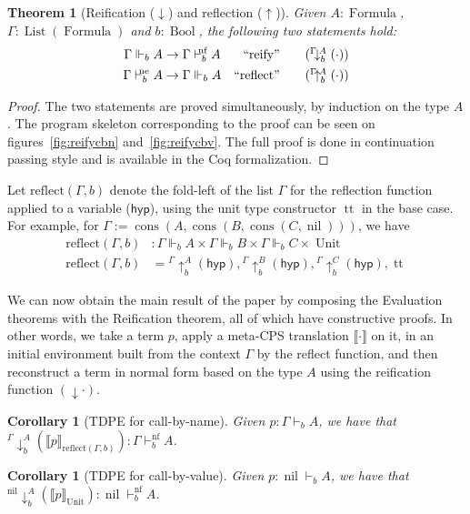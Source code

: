 \documentclass{eptcs}
\newcommand{\hyp}{\mathsf{hyp}}
\DeclareMathOperator{\Nil}{nil}
\DeclareMathOperator{\Cons}{cons}
\DeclareMathOperator{\Unit}{Unit}
\DeclareMathOperator{\one}{tt}
\DeclareMathOperator{\Bool}{Bool}
\DeclareMathOperator{\Formula}{Formula}
\DeclareMathOperator{\List}{List}
\newcommand{\normal}{{\!\!\text{nf}}}
\newcommand{\neutral}{{\!\!\text{ne}}}
\newcommand{\forces}[3]{{#1}\Vdash_{#2}{#3}}
\newcommand{\nil}{{\Nil}}
\newcommand{\cons}[2]{{\Cons{(#1,#2)}}}
\newcommand{\lsup}[1]{{{^#1}}\!\!\!}
\newcommand{\reify}[4]{\lsup{#1}\downarrow_{#2}^{\!{#3}}({#4})}
\newcommand{\reflect}[4]{\lsup{#1}\uparrow_{#2}^{\!{#3}}({#4})}
\newcommand{\eval}[2]{\llbracket{#1}\rrbracket_{#2}}
\newcommand{\Gammareflect}[2]{\text{reflect}({#1},{#2})}
\theoremstyle{definition}
\theoremstyle{plain}
\newtheorem{theorem}[definition]{Theorem}
\newtheorem{corollary}[definition]{Corollary}
\theoremstyle{remark}
\begin{document}
\begin{theorem}[Reification ($\downarrow$) and reflection ($\uparrow$)] Given $A:\Formula$, $\Gamma:\List(\Formula)$ and $b:\Bool$, the following two statements hold:
  \begin{align}
    \forces{\Gamma}{b}{A} &\to \Gamma\vdash^\normal_b A & \text{``reify''} \tag{$\reify{\Gamma}{b}{A}{\cdot}$}\\
    \Gamma\vdash^\neutral_b A &\to \forces{\Gamma}{b}{A} & \text{``reflect''} \tag{$\reflect{\Gamma}{b}{A}{\cdot}$}
  \end{align}
\end{theorem}
\begin{proof} The two statements are proved simultaneously, by induction on the type $A$. The program skeleton corresponding to the proof can be seen on figures~\ref{fig:reifycbn} and~\ref{fig:reifycbv}. The full proof is done in continuation passing style and is available in the Coq formalization.
\end{proof}

Let $\Gammareflect{\Gamma}{b}$ denote the fold-left of the list $\Gamma$ for the reflection function applied to a variable ($\hyp$), using the unit type constructor $\one$ in the base case. For example, for $\Gamma := \cons{A}{\cons{B}{\cons{C}{\nil}}}$, we have
\begin{align*}
\Gammareflect{\Gamma}{b} &: \forces{\Gamma}{b}{A} \times \forces{\Gamma}{b}{B} \times \forces{\Gamma}{b}{C} \times \Unit\\
\Gammareflect{\Gamma}{b} &= \reflect{\Gamma}{b}{A}{\hyp} , \reflect{\Gamma}{b}{B}{\hyp} , \reflect{\Gamma}{b}{C}{\hyp} , \one
\end{align*}

We can now obtain the main result of the paper by composing the Evaluation theorems with the Reification theorem, all of which have constructive proofs. In other words, we take a term $p$, apply a meta-CPS translation $\llbracket\cdot\rrbracket$ on it, in an initial environment built from the context $\Gamma$ by the reflect function, and then reconstruct a term in normal form based on the type $A$ using the reification function $(\downarrow\cdot)$.

\begin{corollary}[TDPE for call-by-name] Given $p : \Gamma\vdash_b A$, we have that $\reify{\Gamma}{b}{A}{\eval{p}{\Gammareflect{\Gamma}{b}}} : \Gamma\vdash^\normal_b A$.
\end{corollary}

\begin{corollary}[TDPE for call-by-value] Given $p : \nil\vdash_b A$, we have that $\reify{\nil}{b}{A}{\eval{p}{\Unit}} : \nil\vdash^\normal_b A$.
\end{corollary}
\end{document}
